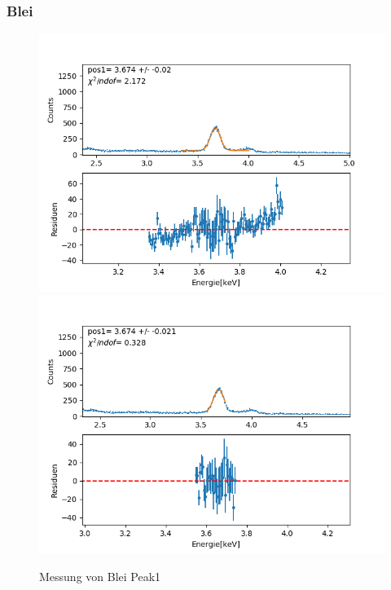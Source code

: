 \documentclass[12pt,a4paper]{article}
\begin{document}
\subsubsection{Blei}
\begin{figure}[H]
\centering
\includegraphics[scale=0.49]{Bilder/roentgen_spektren/blei/pb1_1.png}
\includegraphics[scale=0.49]{Bilder/roentgen_spektren/blei/pb1_2.png}
\caption{Messung von Blei Peak1}
\end{figure}
\end{document}
